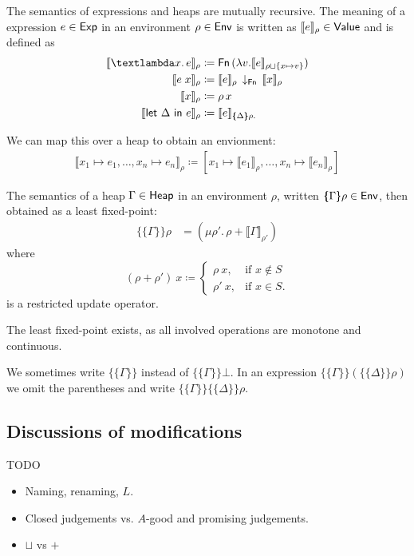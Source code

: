 \documentclass{jfp1}
\theoremstyle{nonumberbreak}
\newcommand{\sExp}   {\text{\textsf{Exp}}}
\newcommand{\sHeap}  {\text{\textsf{Heap}}}
\newcommand{\sValue} {\text{\textsf{Value}}}
\newcommand{\sEnv}   {\text{\textsf{Env}}}
\newcommand{\sFn}[1]{\text{\textsf{Fn}}\,(#1)}
\newcommand{\sFnProj}[2]{#1\,\downarrow_{\text{\textsf{Fn}}}\,#2}
\newcommand{\keyword}[1]{\text{\textsf{#1}}}
\newcommand{\sApp}[2]{#1\;#2}
\newcommand{\sLam}[2]{\text{\textlambda} #1.\, #2}
\newcommand{\sLet}[2]{\keyword{let}~#1~\keyword{in}~#2}
\newcommand{\dom}[1]{\text{dom}\;#1}
\newcommand{\xen}{x_1\mapsto e_1, \ldots, x_n\mapsto e_n}
\newcommand{\dsem}[2]{\llbracket #1 \rrbracket_{#2}}
\newcommand{\esem}[1]{\{\!\!\!\{#1\}\!\!\!\}}
\newcommand{\upd}[1]{\mathop{++_{#1}}}
\begin{document}
The semantics of expressions and heaps are mutually recursive. The meaning of a expression $e \in \sExp$ in an environment $\rho \in \sEnv$ is written as $\dsem e \rho \in \sValue$ and is defined as
\begin{align*}
\dsem{\sLam x e}\rho &\coloneqq \sFn{\lambda v. \dsem e {\rho \sqcup \{x \mapsto v\}}}\\
\dsem{\sApp e  x}\rho &\coloneqq \sFnProj {\dsem e \rho}{\dsem x \rho}\\
\dsem{x}\rho &\coloneqq \rho\,x\\
\dsem{\sLet{\Delta}e}\rho &\coloneqq \dsem e {\esem{\Delta}\rho.}
\end{align*}

We can map this over a heap to obtain an envionment:
\begin{align*}
\dsem{\xen}\rho \coloneqq [x_1 \mapsto \dsem{e_1}{\rho}, \ldots, x_n \mapsto \dsem{e_n}{\rho}]
\end{align*}

The semantics of a heap $\Gamma \in \sHeap$ in an environment $\rho$, written $\esem \Gamma \rho \in \sEnv$, then obtained as a least  fixed-point:
\begin{align*}
\esem{\Gamma}\rho &= (\mu \rho'.\, \rho \upd{\dom \Gamma} \dsem{\Gamma}{\rho'})
\end{align*}
where
\[
(\rho \upd{S} \rho')~x \coloneqq
\begin{cases}
\rho~x, &\text{if } x \notin S \\
\rho'~x, &\text{if } x \in S.
\end{cases}
\]
is a restricted update operator.

The least fixed-point exists, as all involved operations are monotone and continuous.

We sometimes write $\esem{\Gamma}$ instead of $\esem{\Gamma}{\bot}$. In an expression $\esem{\Gamma}(\esem{\Delta}\rho)$ we omit the parentheses and write $\esem{\Gamma}\esem{\Delta}\rho$.


\subsection{Discussions of modifications}

TODO
\begin{itemize}
\item Naming, renaming, $L$.
\item Closed judgements vs. $A$-good and promising judgements.
\item $\sqcup$ vs $\upd \_$
\end{itemize}
\end{document}
